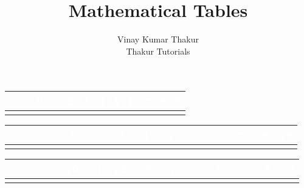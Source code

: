 \documentclass[a4paper, 12pt]{book}
\title{Mathematical Tables}
\author{Vinay Kumar Thakur \\ Thakur Tutorials}
\date{}
\begin{document}
\maketitle


\begin{longtable}{|c||c|ccc|ccc|ccc|}
\hline 
\rowcolor{black}
\textcolor{white}{\bf $\log$} & \textcolor{white}{\bf 0} & \textcolor{white}{\bf 1} & \textcolor{white}{\bf  2} & \textcolor{white}{\bf  3} & \textcolor{white}{\bf  4} & \textcolor{white}{\bf  5} & \textcolor{white}{\bf  6} & \textcolor{white}{\bf  7} & \textcolor{white}{\bf 8} & \textcolor{white}{\bf 9} \\
\hline 
\hline
\endhead 
\hline 
\endfoot

\end{longtable}

\begin{landscape}
\begin{longtable}{|c||c|ccc|ccc|ccc|}
\hline 
\rowcolor{black}
\textcolor{white}{\bf $\log \sin \theta^{\prime}$} & \textcolor{white}{\bf+0} & \textcolor{white}{\bf+1} & \textcolor{white}{\bf +2} & \textcolor{white}{\bf +3} & \textcolor{white}{\bf +4} & \textcolor{white}{\bf +5} & \textcolor{white}{\bf +6} & \textcolor{white}{\bf +7} & \textcolor{white}{\bf +8} & \textcolor{white}{\bf +9} \\
\hline 
\hline
\endhead 
\hline 
\endfoot

\end{longtable}
\end{landscape}

\begin{landscape}
\begin{longtable}{|c||c|ccc|ccc|ccc|}
\hline 
\rowcolor{black}
\textcolor{white}{\bf $\log \tan \theta^{\prime}$} & \textcolor{white}{\bf+0} & \textcolor{white}{\bf+1} & \textcolor{white}{\bf +2} & \textcolor{white}{\bf +3} & \textcolor{white}{\bf +4} & \textcolor{white}{\bf +5} & \textcolor{white}{\bf +6} & \textcolor{white}{\bf +7} & \textcolor{white}{\bf +8} & \textcolor{white}{\bf +9} \\
\hline 
\hline
\endhead 
\hline 
\endfoot

\end{longtable}
\end{landscape}
\end{document}

